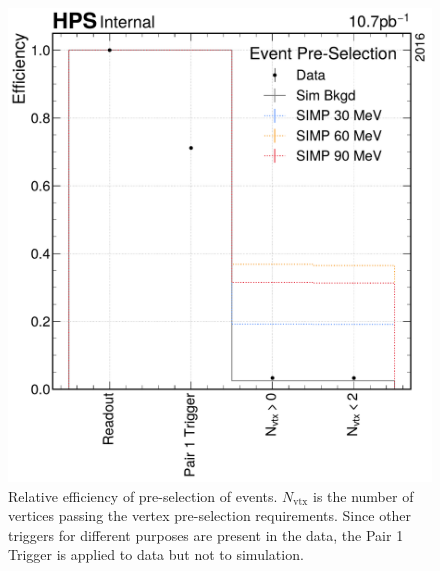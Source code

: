\begin{figure}
  \centering
  \includegraphics[width=\textwidth]{figures/hps/dataset/event-pre-selection-efficiency.pdf}
  \caption{Relative efficiency of pre-selection of events.
  $N_\mathrm{vtx}$ is the number of vertices passing the vertex pre-selection requirements.
  Since other triggers for different purposes are present in the data, the Pair 1 Trigger
  is applied to data but not to simulation.}
  \label{fig:event-pre-selection}
\end{figure}

